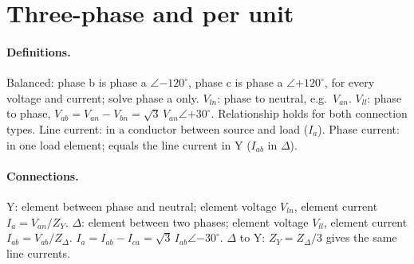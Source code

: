\documentclass{article}
\newcommand{\abs}[1]{\lvert#1\rvert}
\begin{document}





\section{Three-phase and per unit}
\paragraph{Definitions.}
Balanced: phase b is phase a $\angle{-120^\circ}$, phase c is phase a $\angle{+120^\circ}$, for every voltage and current; solve phase a only.
$V_{ln}$: phase to neutral, e.g.\ $V_{an}$.
$V_{ll}$: phase to phase, $V_{ab} = V_{an} - V_{bn} = \sqrt3\,V_{an}\angle{+30^\circ}$.
Relationship holds for both connection types.
Line current: in a conductor between source and load ($I_a$).
Phase current: in one load element; equals the line current in Y ($I_{ab}$ in $\Delta$).

\paragraph{Connections.}
Y: element between phase and neutral; element voltage $V_{ln}$, element current $I_a = V_{an}/Z_Y$.
$\Delta$: element between two phases; element voltage $V_{ll}$, element current $I_{ab} = V_{ab}/Z_\Delta$.
$I_a = I_{ab} - I_{ca} = \sqrt3\,I_{ab}\angle{-30^\circ}$.
$\Delta$ to Y: $Z_Y = Z_\Delta/3$ gives the same line currents.
\end{document}
